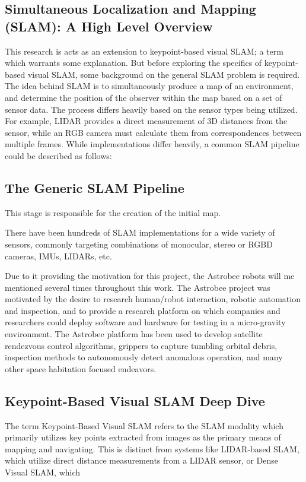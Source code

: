 \documentclass[12pt]{article}
\begin{document}
\subsection{Simultaneous Localization and Mapping (SLAM): A High Level Overview}

This research is acts as an extension to keypoint-based visual SLAM; a term which warrants some explanation. But before exploring the specifics of keypoint-based visual SLAM, some background on the general SLAM problem is required. The idea behind SLAM is to simultaneously produce a map of an environment, and determine the position of the observer within the map based on a set of sensor data. The process differs heavily based on the sensor types being utilized. For example, LIDAR provides a direct measurement of 3D distances from the sensor, while an RGB camera must calculate them from correspondences between multiple frames. While implementations differ heavily, a common SLAM pipeline could be described as follows:

\subsection{The Generic SLAM Pipeline}

This stage is responsible for the creation of the initial map.

There have been hundreds of SLAM implementations for a wide variety of sensors, commonly targeting combinations of monocular, stereo or RGBD cameras, IMUs, LIDARs, etc.

Due to it providing the motivation for this project, the Astrobee robots will me mentioned several times throughout this work. The Astrobee project was motivated by the desire to research human/robot interaction, robotic automation and inspection, and to provide a research platform on which companies and researchers could deploy software and hardware for testing in a micro-gravity environment. The Astrobee platform has been used to develop satellite rendezvous control algorithms, grippers to capture tumbling orbital debris, inspection methods to autonomously detect anomalous operation, and many other space habitation focused endeavors.

\subsection{Keypoint-Based Visual SLAM Deep Dive}

The term Keypoint-Based Visual SLAM refers to the SLAM modality which primarily utilizes key points extracted from images as the primary means of mapping and navigating. This is distinct from systems like LIDAR-based SLAM, which utilize direct distance measurements from a LIDAR sensor, or Dense Visual SLAM, which
\end{document}
